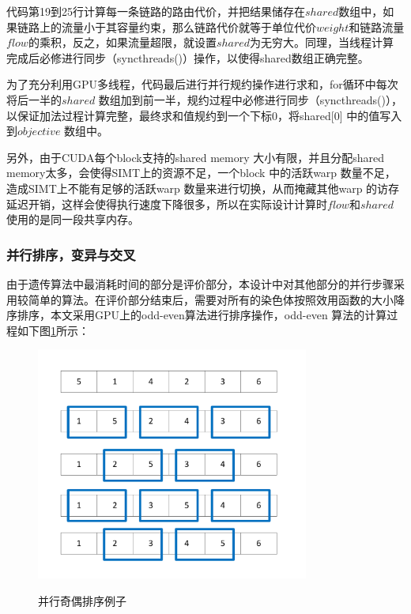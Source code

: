 代码第19到25行计算每一条链路的路由代价，并把结果储存在$shared$数组中，如果链路上的流量小于其容量约束，那么链路代价就等于单位代价$weight$和链路流量$flow$的乘积，反之，如果流量超限，就设置$shared$为无穷大。同理，当线程计算完成后必修进行同步（syncthreads()）操作，以使得shared数组正确完整。	

为了充分利用GPU多线程，代码最后进行并行规约操作进行求和，for循环中每次将后一半的$shared$ 数组加到前一半，规约过程中必修进行同步（syncthreads()），以保证加法过程计算完整，最终求和值规约到一个下标0，将shared[0] 中的值写入到$objective$ 数组中。

另外，由于CUDA每个block支持的shared memory 大小有限，并且分配shared memory太多，会使得SIMT上的资源不足，一个block 中的活跃warp 数量不足，造成SIMT上不能有足够的活跃warp 数量来进行切换，从而掩藏其他warp 的访存延迟开销，这样会使得执行速度下降很多，所以在实际设计计算时$flow$和$shared$使用的是同一段共享内存。
\subsubsection{并行排序，变异与交叉}
由于遗传算法中最消耗时间的部分是评价部分，本设计中对其他部分的并行步骤采用较简单的算法。在评价部分结束后，需要对所有的染色体按照效用函数的大小降序排序，本文采用GPU上的odd-even算法进行排序操作，odd-even 算法的计算过程如下图\ref{oddeven}所示：
\begin{figure}
  \begin{center}
    {\includegraphics[width=0.8\textwidth]{figures/odd-even.pdf}}
    \end{center}
  \caption{{\footnotesize{并行奇偶排序例子}}}
  \label{oddeven}
\end{figure}

